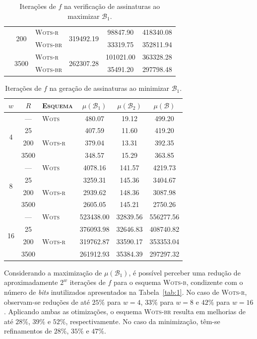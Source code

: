 \documentclass{ufsctex/ufsctex}
\newcommand{\wots}{\textsc{Wots}}
\newcommand{\wotsb}{\textsc{Wots-b}}
\newcommand{\wotsr}{\textsc{Wots-r}}
\newcommand{\wotsbr}{\textsc{Wots-br}}
\begin{document}
\begin{table}
\begin{tabular}{cclccc}
    & \multirow{2}{*}{200}
      & \wotsr{} & \multirow{2}{*}{319492.19} & 98847.90 & 418340.08 \\
    & & \wotsbr{} & & 33319.75 & 352811.94 \\ \cline{2-6}
    & \multirow{2}{*}{3500}
      & \wotsr{} & \multirow{2}{*}{262307.28} & 101021.00 & 363328.28 \\
    & & \wotsbr{} & & 35491.20 & 297798.48 \\
 \bottomrule
 \end{tabular}
  \caption{Iterações de $f$ na verificação de assinaturas ao maximizar
    $\mathcal{B}_1$.}\label{tab:2}
\end{table}

\begin{table}
  \setlength{\tabcolsep}{8pt}
  \footnotesize
  \centering
  \begin{tabular}{cclccc}
    \toprule
    $w$ & $R$
      & \textsc{Esquema} & $\mu(\mathcal{B}_1)$
      & $\mu(\mathcal{B}_2)$ & $\mu(\mathcal{B})$ \\
    \toprule
    \multirow{4}{*}{4} & --- & \wots{} & 480.07 & 19.12 & 499.20 \\
    & 25 & \multirow{3}{*}{\wotsr{}} & 407.59 & 11.60 & 419.20 \\
    & 200 & & 379.04 & 13.31 & 392.35 \\
    & 3500 & & 348.57 & 15.29 & 363.85 \\
    \midrule
    \multirow{4}{*}{8} & --- & \wots{} & 4078.16 & 141.57 & 4219.73 \\
    & 25 & \multirow{3}{*}{\wotsr{}} & 3259.31 & 145.36 & 3404.67 \\
    & 200 & & 2939.62 & 148.36 & 3087.98 \\
    & 3500 & & 2605.05 & 145.21 & 2750.26 \\
    \midrule
    \multirow{4}{*}{16} & --- & \wots{} & 523438.00 & 32839.56 & 556277.56 \\
    & 25 & \multirow{3}{*}{\wotsr{}} & 376093.98 & 32646.83 & 408740.82 \\
    & 200 & & 319762.87 & 33590.17 & 353353.04 \\
    & 3500 & & 261912.93 & 35384.39 & 297297.32 \\
    \bottomrule
  \end{tabular}
  \caption{Iterações de $f$ na geração de assinaturas ao minimizar
    $\mathcal{B}_1$.}\label{tab:3}
\end{table}

Considerando a maximização de $\mu(\mathcal{B}_1)$, é possível perceber uma
redução de aproximadamente $2^w$ iterações de $f$ para o esquema \wotsb{},
condizente com o número de \emph{bits} inutilizados apresentados na
Tabela~\ref{tab:1}. No caso de \wotsr{}, observam-se reduções de até $25\%$
para $w = 4$, $33\%$ para $w = 8$ e $42\%$ para $w = 16$. Aplicando ambas as
otimizações, o esquema \wotsbr{} resulta em melhorias de até $28\%$, $39\%$ e
$52\%$, respectivamente. No caso da minimização, têm-se refinamentos de $28\%$,
$35\%$ e $47\%$.
\end{document}
